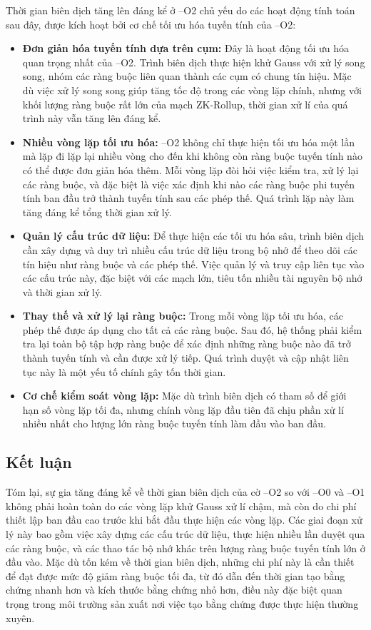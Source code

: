 Thời gian biên dịch tăng lên đáng kể ở --O2 chủ yếu do các hoạt động tính toán sau đây, được kích hoạt bởi cơ chế tối ưu hóa tuyến tính của --O2:

\begin{itemize}
    \item \textbf{Đơn giản hóa tuyến tính dựa trên cụm:} Đây là hoạt động tối ưu hóa quan trọng nhất của --O2. Trình biên dịch thực hiện khử Gauss với xử lý song song, nhóm các ràng buộc liên quan thành các cụm có chung tín hiệu. Mặc dù việc xử lý song song giúp tăng tốc độ trong các vòng lặp chính, nhưng với khối lượng ràng buộc rất lớn của mạch ZK-Rollup, thời gian xử lí của quá trình này vẫn tăng lên đáng kể.
    \item \textbf{Nhiều vòng lặp tối ưu hóa:} --O2 không chỉ thực hiện tối ưu hóa một lần mà lặp đi lặp lại nhiều vòng cho đến khi không còn ràng buộc tuyến tính nào có thể được đơn giản hóa thêm. Mỗi vòng lặp đòi hỏi việc kiểm tra, xử lý lại các ràng buộc, và đặc biệt là việc xác định khi nào các ràng buộc phi tuyến tính ban đầu trở thành tuyến tính sau các phép thế. Quá trình lặp này làm tăng đáng kể tổng thời gian xử lý.
    \item \textbf{Quản lý cấu trúc dữ liệu:} Để thực hiện các tối ưu hóa sâu, trình biên dịch cần xây dựng và duy trì nhiều cấu trúc dữ liệu trong bộ nhớ để theo dõi các tín hiệu như ràng buộc và các phép thế. Việc quản lý và truy cập liên tục vào các cấu trúc này, đặc biệt với các mạch lớn, tiêu tốn nhiều tài nguyên bộ nhớ và thời gian xử lý.
    \item \textbf{Thay thế và xử lý lại ràng buộc:} Trong mỗi vòng lặp tối ưu hóa, các phép thế được áp dụng cho tất cả các ràng buộc. Sau đó, hệ thống phải kiểm tra lại toàn bộ tập hợp ràng buộc để xác định những ràng buộc nào đã trở thành tuyến tính và cần được xử lý tiếp. Quá trình duyệt và cập nhật liên tục này là một yếu tố chính gây tốn thời gian.
    \item \textbf{Cơ chế kiểm soát vòng lặp:} Mặc dù trình biên dịch có tham số để giới hạn số vòng lặp tối đa, nhưng chính vòng lặp đầu tiên đã chịu phần xử lí nhiều nhất cho lượng lớn ràng buộc tuyến tính làm đầu vào ban đầu.
\end{itemize}

\subsection{Kết luận}

Tóm lại, sự gia tăng đáng kể về thời gian biên dịch của cờ --O2 so với --O0 và --O1 không phải hoàn toàn do các vòng lặp khử Gauss xử lí chậm, mà còn do chi phí thiết lập ban đầu cao trước khi bắt đầu thực hiện các vòng lặp. Các giai đoạn xử lý này bao gồm việc xây dựng các cấu trúc dữ liệu, thực hiện nhiều lần duyệt qua các ràng buộc, và các thao tác bộ nhớ khác trên lượng ràng buộc tuyến tính lớn ở đầu vào. Mặc dù tốn kém về thời gian biên dịch, những chi phí này là cần thiết để đạt được mức độ giảm ràng buộc tối đa, từ đó dẫn đến thời gian tạo bằng chứng nhanh hơn và kích thước bằng chứng nhỏ hơn, điều này đặc biệt quan trọng trong môi trường sản xuất nơi việc tạo bằng chứng được thực hiện thường xuyên.